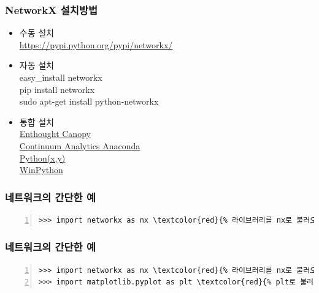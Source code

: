 \documentclass{beamer}
\begin{document}
\begin{frame}
\frametitle{NetworkX 설치방법}
\begin{itemize}
\item 수동 설치 \hfill \\
\href{https://pypi.python.org/pypi/networkx/}{https://pypi.python.org/pypi/networkx/}
\item 자동 설치 \hfill \\
easy\_install networkx\\
pip install networkx\\
sudo apt-get install python-networkx
\item 통합 설치 \hfill \\
\href{https://www.enthought.com/products/canopy/}{Enthought Canopy}\\
\href{https://store.continuum.io/}{Continuum Analytics Anaconda}\\
\href{https://code.google.com/p/pythonxy/}{Python(x,y)}\\
\href{https://code.google.com/p/winpython/}{WinPython}
\end{itemize}
\end{frame}

\begin{frame}[fragile] %
\frametitle{네트워크의 간단한 예}
\begin{Verbatim}[numbers=left,commandchars=\\\{\}]
>>> import networkx as nx \textcolor{red}{% 라이브러리를 nx로 불러오기}
\end{Verbatim}
\end{frame}

\begin{frame}[fragile] %
\frametitle{네트워크의 간단한 예}
\begin{Verbatim}[numbers=left,commandchars=\\\{\}]
>>> import networkx as nx \textcolor{red}{% 라이브러리를 nx로 불러오기}
>>> import matplotlib.pyplot as plt \textcolor{red}{% plt로 불러오기}
\end{Verbatim}
\end{frame}
\end{document}

